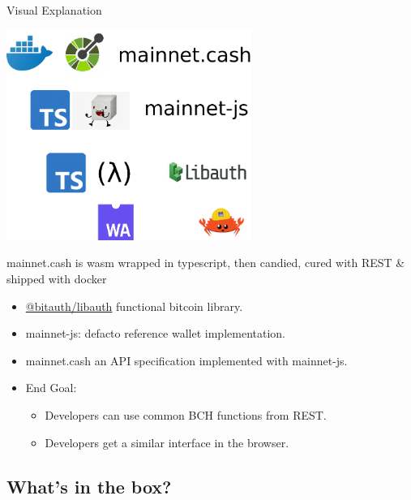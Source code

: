 \documentclass{beamer}
\begin{document}
\begin{frame}{Visual Explanation}{}

  \includegraphics[width=0.6\textwidth, angle=0]{stack.pdf}
\end{frame}


\begin{frame}{mainnet.cash is wasm wrapped in typescript, then candied, cured with REST \& shipped with docker}{}

  
  \begin{itemize}
  \item
    \href{https://libauth.org/}{@bitauth/libauth} functional bitcoin library.
  \item
    mainnet-js: defacto reference wallet implementation. 
  \item
    mainnet.cash an API specification implemented with mainnet-js.
    \item
        End Goal:
        \begin{itemize}
        \item
        Developers can use common BCH functions from REST.
        \item
        Developers get a similar interface in the browser. 
        \end{itemize}
  \end{itemize}
  
\end{frame}
\subsection[Batteries included]{What's in the box?}
\end{document}
